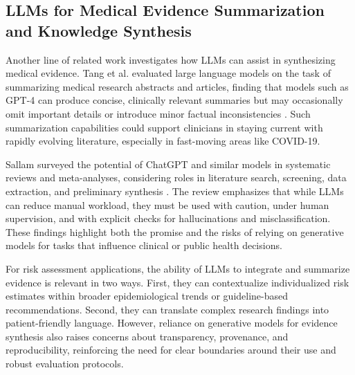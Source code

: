 \subsection{LLMs for Medical Evidence Summarization and Knowledge Synthesis}

Another line of related work investigates how LLMs can assist in synthesizing medical evidence. Tang et al. evaluated large language models on the task of summarizing medical research abstracts and articles, finding that models such as GPT-4 can produce concise, clinically relevant summaries but may occasionally omit important details or introduce minor factual inconsistencies \cite{tang2023evaluating}. Such summarization capabilities could support clinicians in staying current with rapidly evolving literature, especially in fast-moving areas like COVID-19.

Sallam surveyed the potential of ChatGPT and similar models in systematic reviews and meta-analyses, considering roles in literature search, screening, data extraction, and preliminary synthesis \cite{sallam2023chatgpt}. The review emphasizes that while LLMs can reduce manual workload, they must be used with caution, under human supervision, and with explicit checks for hallucinations and misclassification. These findings highlight both the promise and the risks of relying on generative models for tasks that influence clinical or public health decisions.

For risk assessment applications, the ability of LLMs to integrate and summarize evidence is relevant in two ways. First, they can contextualize individualized risk estimates within broader epidemiological trends or guideline-based recommendations. Second, they can translate complex research findings into patient-friendly language. However, reliance on generative models for evidence synthesis also raises concerns about transparency, provenance, and reproducibility, reinforcing the need for clear boundaries around their use and robust evaluation protocols.
